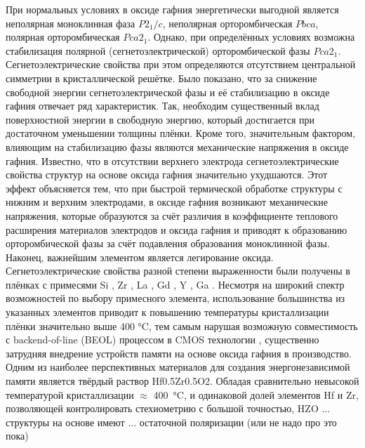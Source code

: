 При нормальных условиях в оксиде гафния энергетически выгодной является неполярная моноклинная фаза \(P2_1/c\), неполярная орторомбическая \(Pbca\), полярная орторомбическая \(Pca2_1\). Однако, при определённых условиях возможна стабилизация полярной (сегнетоэлектрической) орторомбической фазы \(Pca2_1\). Сегнетоэлектрические свойства при этом определяются отсутствием центральной симметрии в кристаллической решётке.
Было показано, что за снижение свободной энергии сегнетоэлектрической фазы и её стабилизацию в оксиде гафния отвечает ряд характеристик. Так, необходим существенный вклад поверхностной энергии в свободную энергию, который достигается при достаточном уменьшении толщины плёнки. Кроме того, значительным фактором, влияющим на стабилизацию фазы являются механические напряжения в оксиде гафния. Известно, что в отсутствии верхнего электрода сегнетоэлектрические свойства структур на основе оксида гафния значительно ухудшаются. Этот эффект объясняется тем, что при быстрой термической обработке структуры с нижним и верхним электродами, в оксиде гафния возникают механические напряжения, которые образуются за счёт различия в коэффициенте теплового расширения материалов электродов и оксида гафния и приводят к образованию орторомбической фазы за счёт подавления образования моноклинной фазы. Наконец, важнейшим элементом является легирование оксида. Сегнетоэлектрические свойства разной степени выраженности были получены в плёнках с примесями Si \cite{}, Zr \cite{}, La \cite{}, Gd \cite{}, Y \cite{}, Ga \cite{chouprikNanoscaleDopingIts2022}. Несмотря на широкий спектр возможностей по выбору примесного элемента, использование большинства из указанных элементов приводит к повышению температуры кристаллизации плёнки значительно выше 400 \si{\degreeCelsius}, тем самым нарушая возможную совместимость с backend-of-line (BEOL) процессом в CMOS технологии \cite{schmitzLowTemperatureThin2018}, существенно затрудняя внедрение устройств памяти на основе оксида гафния в производство. Одним из наиболее перспективных материалов для создания энергонезависимой памяти является твёрдый раствор Hf0.5Zr0.5O2. Обладая сравнительно невысокой температурой кристаллизации \(\approx\) \SI{400}{\degreeCelsius}, и одинаковой долей элементов Hf и Zr, позволяющей контролировать стехиометрию с большой точностью, HZO ... структуры на основе имеют ... остаточной поляризации (или не надо про это пока)
